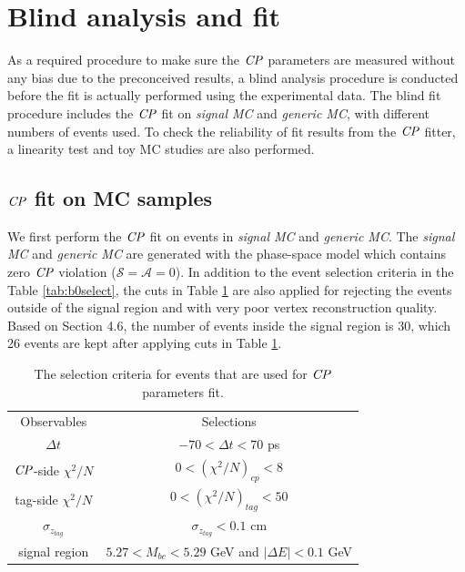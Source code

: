 \section{Blind analysis and fit}
As a required procedure to make sure the $\it{CP}$ parameters are measured without any bias due to the preconceived results, a blind analysis procedure is conducted before the fit is actually performed using the experimental data. The blind fit procedure includes the $\it{CP}$ fit on \textit{signal MC} and \textit{generic MC}, with different numbers of events used. To check the reliability of fit results from the $\it{CP}$ fitter, a linearity test and toy MC studies are also performed. 

\subsection{$\it{CP}$ fit on MC samples}
We first perform the $\it{CP}$ fit on events in \textit{signal MC} and \textit{generic MC}.
The \textit{signal MC} and \textit{generic MC} are generated with the phase-space model which contains zero $\it{CP}$ violation ($\mathcal{S}=\mathcal{A}=0$). In addition to the event selection criteria in the Table \ref{tab:b0select}, the cuts in Table \ref{tab:cutCP} are also applied for rejecting the events outside of the signal region and with very poor vertex reconstruction quality. Based on Section 4.6, the number of events inside the signal region is 30, which 26 events are kept after applying cuts in Table \ref{tab:cutCP}.
\begin{table}
	\centering
	\caption{The selection criteria for events that are used for $\it{CP}$ parameters fit.}
	\label{tab:cutCP}
\begin{tabular}{c|c}
	\hline
	Observables & Selections \\
	$\Delta t$ & $-70 < \Delta t < 70$ ps\\
	$\it{CP}$-side $\chi^2/N$ & $0 < (\chi^2/N)_{cp} < 8 $ \\
	tag-side $\chi^2/N$  & $0 < (\chi^2/N)_{tag} < 50 $\\
	$\sigma_{z_{tag}}$ &  $\sigma_{z_{tag}} < 0.1$ cm\\
	signal region & $5.27 < M_{bc} < 5.29$ GeV and $|\Delta E| < 0.1$ GeV\\
	\hline
\end{tabular}
\end{table}

